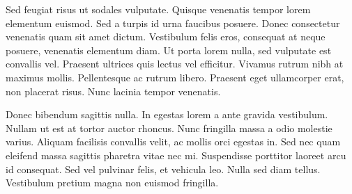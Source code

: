 Sed feugiat risus ut sodales vulputate. Quisque venenatis tempor lorem elementum euismod. Sed a turpis id urna faucibus posuere. Donec consectetur venenatis quam sit amet dictum. Vestibulum felis eros, consequat at neque posuere, venenatis elementum diam. Ut porta lorem nulla, sed vulputate est convallis vel. Praesent ultrices quis lectus vel efficitur. Vivamus rutrum nibh at maximus mollis. Pellentesque ac rutrum libero. Praesent eget ullamcorper erat, non placerat risus. Nunc lacinia tempor venenatis.

Donec bibendum sagittis nulla. In egestas lorem a ante gravida vestibulum. Nullam ut est at tortor auctor rhoncus. Nunc fringilla massa a odio molestie varius. Aliquam facilisis convallis velit, ac mollis orci egestas in. Sed nec quam eleifend massa sagittis pharetra vitae nec mi. Suspendisse porttitor laoreet arcu id consequat. Sed vel pulvinar felis, et vehicula leo. Nulla sed diam tellus. Vestibulum pretium magna non euismod fringilla.